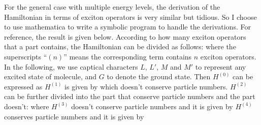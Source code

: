 For the general case with multiple energy levels, the derivation of the Hamiltonian in terms of exciton operators is
very similar but tidious. So I choose to use mathematica to write a symbolic program to handle the derivations. For 
reference, the result is given below. According to how many exciton operators that a part contains, the Hamiltonian can be divided as follows:
where the superscripts ``$(n)$'' means the corresponding term contains $n$ exciton operators. In the following, we 
use captical characters $L$, $L'$, $M$ and $M'$ to represent any excited state of molecule, and $G$ to denote the 
ground state. Then $H^{(0)}$ can be expressed as
$H^{(1)}$ is given by
which doesn't conserve particle numbers. 
$H^{(2)}$ can be further divided into the part that conserve particle numbers and the part doesn't:
where
$H^{(3)}$ doesn't conserve particle numbers and it is given by
$H^{(4)}$ conserves particle numbers and it is given by


